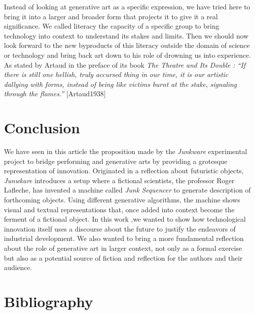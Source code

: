 \bigskip

Instead of looking at generative art as a specific expression, we have
tried here to bring it into a larger and broader form that projects it
to give it a real significance. We called literacy the capacity of a
specific group to bring technology into context to understand its
stakes and limits. Then we should now look forward to the new
byproducts of this literacy outside the domain of science or technology
and bring back art down to his role of drowning us into experience. As
stated by Artaud in the preface of its book \textit{The Theatre and Its
Double : }\textit{{\textquotedblleft}}\textit{I}\textit{f there is
still one hellish, truly accursed thing in our time, it is our artistic
dallying with forms, instead of being like victims burnt at the stake,
signaling through the }\textit{flames.{\textquotedblright}
}[Artaud1938] 

\section{Conclusion}
We have seen in this article the proposition made by the
\textit{Junkware} experimental project to bridge performing and
generative arts by providing a grotesque representation of innovation.
Originated in a reflection about futuristic objects, \textit{Junwkare
}introduces a setup where a fictional scientists, the professor Roger
Lafleche, has invented a machine called \textit{Junk Sequencer} to
generate description of forthcoming objects. Using different generative
algorithms, the machine shows visual and textual representations that,
once added into context become the ferment of a fictional object. In
this work ,we wanted to show how technological innovation itself uses a
discourse about the future to justify the endeavors of industrial
development. We also wanted to bring a more fundamental reflection
about the role of generative art in larger context, not only as a
formal exercise but also as a potential source of fiction and
reflection for the authors and their audience.


\bigskip

\section{Bibliography}
